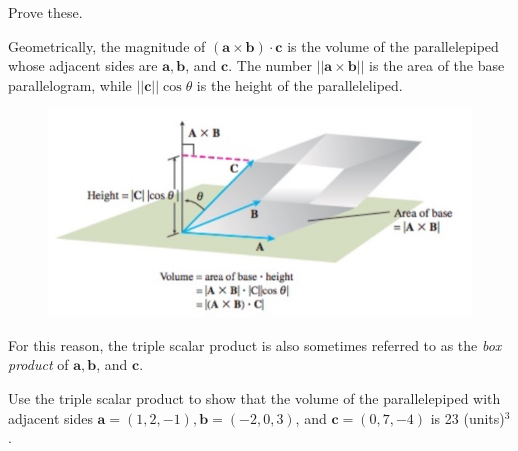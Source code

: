 \documentclass[12pt,letterpaper,reqno]{article}
\numberwithin{equation}{section}
\begin{document}
\begin{exercise}
Prove these.	
\end{exercise}

Geometrically, the magnitude of $(\mathbf{a} \times \mathbf{b})\cdot \mathbf{c}$ is the volume of the parallelepiped whose adjacent sides are $\mathbf{a},\mathbf{b}$, and $\mathbf{c}$. The number $||\mathbf{a} \times \mathbf{b}||$ is the area of the base parallelogram, while $||\mathbf{c}||\cos \theta$ is the height of the paralleleliped.
\begin{figure}[h]
	\begin{center}
		\includegraphics[scale=0.5]{figures_mvc/ppiped}
	\end{center}
\end{figure}
For this reason, the triple scalar product is also sometimes referred to as the \emph{box product} of $\mathbf{a},\mathbf{b}$, and $\mathbf{c}$.

\begin{exercise}
Use the triple scalar product to show that the volume of the parallelepiped with adjacent sides $\mathbf{a}=(1,2,-1), \mathbf{b}=(-2,0,3)$, and $\mathbf{c}=(0,7,-4)$ is 23 (units)$^3$.	
\end{exercise}
\end{document}
